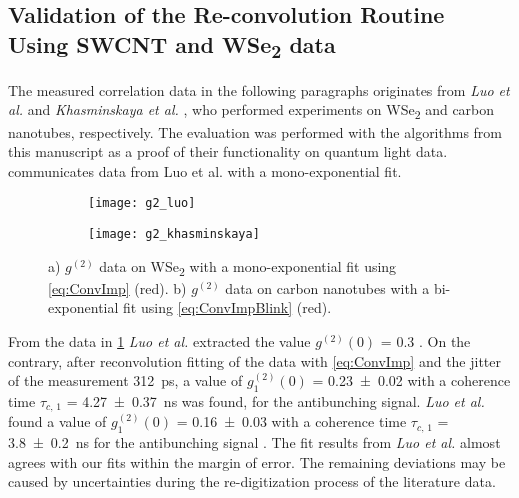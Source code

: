 \subsection{Validation of the Re-convolution Routine Using SWCNT and \texorpdfstring{WSe\textsubscript{2}}{WS2} data}\label{sec:g2_cw_SWCNT}
The measured correlation data in the following paragraphs originates from \textit{Luo et al.} \cite{luo_deterministic_2018} and \textit{Khasminskaya et al.} \cite{khasminskaya_fully_2016}, who performed experiments on WSe\textsubscript{2} and carbon nanotubes, respectively. The evaluation was performed with the algorithms from this manuscript as a proof of their functionality on quantum light data.  communicates data from Luo et al. with a mono-exponential fit.
\begin{figure}[htp]
	\centering
	\begin{subfigure}{0.49\textwidth}
		\centering
		\texttt{[image: g2\_luo]}
		\caption{}
		\label{fig:g2_Luo}
	\end{subfigure}
	\hfill
	\begin{subfigure}{0.48\textwidth}
		\centering
		\texttt{[image: g2\_khasminskaya]}
		\caption{}
		\label{fig:g2_Khasminskaya}
	\end{subfigure}
	\caption{a) $g^{(2)}$ data on WSe\textsubscript{2} with a mono-exponential fit using \cref{eq:ConvImp} (red). b) $g^{(2)}$ data on carbon nanotubes with a bi-exponential fit using \cref{eq:ConvImpBlink} (red).}
\end{figure}
\noindent From the data in \cref{fig:g2_Luo} \textit{Luo et al.} extracted the value $g^{(2)}(0)$ = \num{0.3} \cite{luo_deterministic_2018}. On the contrary, after reconvolution fitting of the data with \cref{eq:ConvImp} and the jitter of the measurement \SI{312}{\ps}, a value of $g^{(2)}_{1}(0)$ = \num{0.23\pm0.02} with a coherence time $\tau_{c,\,1}$ = \SI{4.27\pm0.37}{\ns} was found, for the antibunching signal. \textit{Luo et al.} found a value of $g^{(2)}_{1}(0)$ = \num{0.16\pm0.03} with a coherence time $\tau_{c,\,1}$ = \SI{3.8\pm0.2}{\ns} for the antibunching signal \cite{luo_deterministic_2018}. The fit results from \textit{Luo et al.} almost agrees with our fits within the margin of error. The remaining deviations may be caused by uncertainties during the re-digitization process of the literature data.\\
